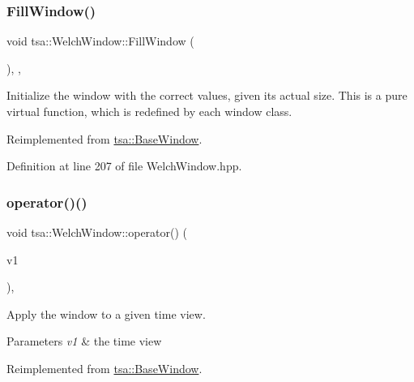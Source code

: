 \subsubsection{\texorpdfstring{Fill\+Window()}{FillWindow()}}
{\footnotesize\ttfamily void tsa\+::\+Welch\+Window\+::\+Fill\+Window (\begin{DoxyParamCaption}{ }\end{DoxyParamCaption})\hspace{0.3cm}{\ttfamily [inline]}, {\ttfamily [private]}, {\ttfamily [virtual]}}

Initialize the window with the correct values, given its actual size. This is a pure virtual function, which is redefined by each window class. 

Reimplemented from \hyperlink{classtsa_1_1_base_window_aa74b29105d94caa521d308198e8e6643}{tsa\+::\+Base\+Window}.



Definition at line 207 of file Welch\+Window.\+hpp.

\mbox{\label{classtsa_1_1_welch_window_a4a3b7999c9d75b916d682dc0f94c87db}} 
\subsubsection{\texorpdfstring{operator()()}{operator()()}\hspace{0.1cm}{\footnotesize\ttfamily [1/2]}}
{\footnotesize\ttfamily void tsa\+::\+Welch\+Window\+::operator() (\begin{DoxyParamCaption}\item[{\hyperlink{namespacetsa_ac599574bcc094eda25613724b8f3ca9e}{Seq\+View\+Double} \&}]{v1 }\end{DoxyParamCaption})\hspace{0.3cm}{\ttfamily [inline]}, {\ttfamily [virtual]}}

Apply the window to a given time view.


\begin{DoxyParams}{Parameters}
{\em v1} & the time view \\
\hline
\end{DoxyParams}


Reimplemented from \hyperlink{classtsa_1_1_base_window_a05d9edb95dc01840a1b2df78dfa3a8c1}{tsa\+::\+Base\+Window}.



